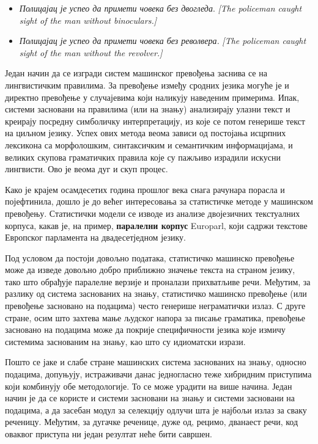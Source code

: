 {\begin{multicols}{2}
\begin{itemize} 
\item \textit{Полицајац је успео да примети човека без двогледа}. \textit{[The policeman caught sight of the man without binoculars.]}
\item \textit{Полицајац је успео да примети човека без револвера.} \textit{[The policeman caught sight of  the man without the revolver.]}
\end{itemize}
Један начин да се изгради систем машинског превођења заснива се на лингвистичким правилима. За превођење између сродних језика могуће је и директно превођење у случајевима који наликују наведеним примерима. Ипак, системи засновани на правилима (или на знању) анализирају улазни текст и креирају посредну симболичку интерпретацију, из које се потом генерише текст на циљном језику. Успех ових метода веома зависи од постојања исцрпних лексикона са морфолошким, синтаксичким и семантичким информацијама, и великих скупова граматичких правила које су пажљиво израдили искусни лингвисти. Ово је веома дуг и скуп процес.

Како је крајем осамдесетих година прошлог века снага рачунара порасла и појефтинила, дошло је до већег интересовања за статистичке методе у машинском превођењу. Статистички модели се изводе из анализе двојезичних текстуалних корпуса, какав је, на пример, \textbf{паралелни корпус} Europarl, који садржи текстове Европског парламента на двадесетједном језику. 

Под условом да постоји довољно података, статистичко машинско превођење може да изведе довољно добро приближно значење текста на страном језику, тако што обрађује паралелне верзије и проналази прихватљиве речи. Међутим, за разлику од система заснованих на знању, статистичко машинско превођење (или превођење засновано на подацима) често генерише неграматички излаз. С друге стране, осим што захтева мање људског напора за писање граматика, превођење засновано на подацима  може да покрије специфичности језика које измичу системима заснованим на знању, као што су идиоматски изрази.  

Пошто се јаке и слабе стране машинских система заснованих на знању, односно подацима, допуњују, истраживачи данас једногласно теже хибридним приступима који комбинују обе методологије. То се може урадити на више начина. Један начин је да се користе и системи засновани на знању и системи засновани на подацима, а да засебан модул за селекцију одлучи шта је најбољи излаз за сваку реченицу. Међутим, за дугачке реченице, дуже од, рецимо, дванаест речи, код оваквог приступа ни један резултат неће бити савршен. 


\end{multicols}}
